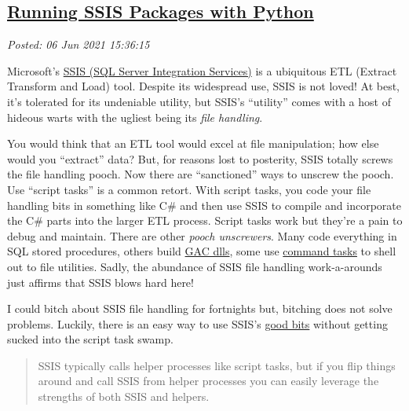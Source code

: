 %


\subsection*{\href{https://analyzethedatanotthedrivel.org/2021/06/05/running-ssis-packages-with-python/}{Running SSIS Packages with Python}}


\noindent\emph{Posted: 06 Jun 2021 15:36:15}
\vspace{6pt}


Microsoft's
\href{https://docs.microsoft.com/en-us/sql/integration-services/sql-server-integration-services?view=sql-server-ver15}{SSIS
(SQL Server Integration Services)} is a ubiquitous ETL (Extract
Transform and Load) tool. Despite its widespread use, SSIS is not loved!
At best, it's tolerated for its undeniable utility, but SSIS's
``utility'' comes with a host of hideous warts with the ugliest being
its \emph{file handling}.

You would think that an ETL tool would excel at file manipulation; how
else would you ``extract'' data? But, for reasons lost to posterity,
SSIS totally screws the file handling pooch. Now there are
``sanctioned'' ways to unscrew the pooch. Use ``script tasks'' is a
common retort. With script tasks, you code your file handling bits in
something like C\# and then use SSIS to compile and incorporate the C\#
parts into the larger ETL process. Script tasks work but they're a pain
to debug and maintain. There are other \emph{pooch unscrewers}. Many
code everything in SQL stored procedures, others build
\href{https://stackoverflow.com/questions/1268342/what-is-the-gac-in-net}{GAC
dlls}, some use
\href{https://docs.microsoft.com/en-us/sql/integration-services/control-flow/execute-process-task?view=sql-server-ver15}{command
tasks} to shell out to file utilities. Sadly, the abundance of SSIS file
handling work-a-arounds just affirms that SSIS blows hard here!

I could bitch about SSIS file handling for fortnights but, bitching does
not solve problems. Luckily, there is an easy way to use SSIS's
\href{https://www.youtube.com/watch?v=wPiHQ37gXnE}{good bits} without
getting sucked into the script task swamp.

\begin{quote}
SSIS typically calls helper processes like script tasks, but if you flip
things around and call SSIS from helper processes you can easily
leverage the strengths of both SSIS and helpers.
\end{quote}

